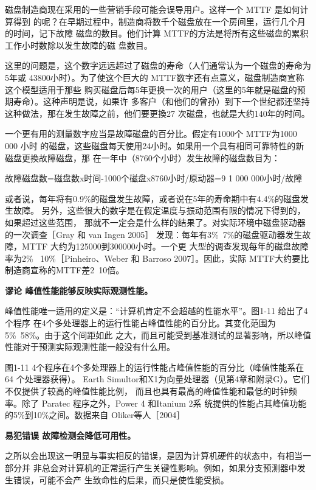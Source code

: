 磁盘制造商现在采用的一些营销手段可能会误导用户。这样一个 MTTF 是如何计算得到
的呢？在早期过程中，制造商将数千个磁盘放在一个房间里，运行几个月的时间，记下故障
磁盘的数目。他们计算 MTTF的方法是将所有这些磁盘的累积工作小时数除以发生故障的磁
盘数目。

这里的问题是，这个数字远远超过了磁盘的寿命（人们通常认为一个磁盘的寿命为5年或
43800小时）。为了使这个巨大的 MTTF数字还有点意义，磁盘制造商宣称这个模型适用于那些
购买磁盘后每5年更换一次的用户（这里的5年就是磁盘的预期寿命）。这种声明是说，如果许
多客户（和他们的曾孙）到下一个世纪都还坚持这种做法，那在发生故障之前，他们要更換27
次磁盘，也就是大约140年的时间。

一个更有用的测量数字应当是故障磁盘的百分比。假定有1000个 MTTF为1000 000 小时
的磁盘，这些磁盘每天使用24小时。如果用一个具有相同可靠特性的新磁盘更換故障磁盘，那
在一年中（8760个小时）发生故障的磁盘数目为：

故障磁盘数=磁盘数x时间-1000个磁盘x8760小时/原动器=9
1 000 000小时/故障

或者说，每年将有0.9\%的磁盘发生故障，或者说在5年的寿命期中有4.4\%的磁盘发生故障。
另外，这些很大的数字是在假定温度与振动范围有限的情况下得到的，如果超过这些范围，
那就不一定会是什么样的结果了。对实际环境中磁盘驱动器的一次调查［Gray 和 van Ingen 2005］
发现：每年有3\%~7\%的磁盘驱动器发生故障，MTTF 大约为125000到300000小时。一个更
大型的调查发现每年的磁盘故障率为2\%~ 10\%［Pinheiro、Weber 和 Barroso 2007］。因此，实际
MTTF大约要比制造商宣称的MTTF差2~10倍。

\textbf{谬论 峰值性能能够反映实际观测性能。}

峰值性能唯一适用的定义是：“计算机肯定不会超越的性能水平”。图1-11 给出了4个程序
在4个多处理器上的运行性能占峰值性能的百分比。其变化范围为5\%~58\%。由于这个间距如此
之大，而且可能受到基准测试的显著影响，所以峰值性能对于预测实际观测性能一般没有什么用。

图1-11 4个程序在4个多处理器上的运行性能占峰值性能的百分比（峰值性能系在64 个处理器获得）。
Earth Simultor和X1为向量处理器（见第4章和附录G）。它们不仅提供了较高的峰值性能比例，
而且也具有最高的峰值性能和最低的时钟频率。除了 Paratec 程序之外，Power 4 和Itanium 2系
统提供的性能占其峰值功能的5\%到10\%之间。数据来自 Oliker等人［2004］

\textbf{易犯错误 故障检测会降低可用性。}

之所以会出现这一明显与事实相反的错误，是因为计算机硬件的状态中，有相当一部分并
非总会对计算机的正常运行产生关键性影响。例如，如果分支预测器中发生错误，可能不会产
生致命性的后果，而只是使性能受损。

